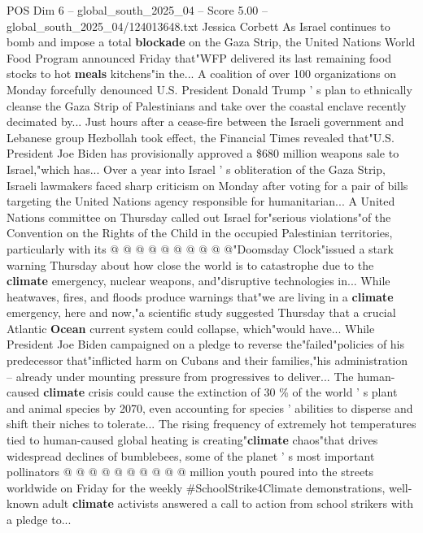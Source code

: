 \begin{textsample}{POS Dim 6 – global\_south\_2025\_04 – Score 5.00 – global\_south\_2025\_04/124013648.txt}  \label{ex:f6_pos_234}
Jessica Corbett As Israel continues to bomb and impose a total \textbf{blockade} on the Gaza Strip, the United Nations World Food Program announced Friday that"WFP delivered its last remaining food stocks to hot \textbf{meals} kitchens"in the...
A coalition of over 100 organizations on Monday forcefully denounced U.S.
President Donald Trump ' s plan to ethnically cleanse the Gaza Strip of Palestinians and take over the coastal enclave recently decimated by...
Just hours after a cease-fire between the Israeli government and Lebanese group Hezbollah took effect, the Financial Times revealed that"U.S.
President Joe Biden has provisionally approved a \$680 million weapons sale to Israel,"which has...
Over a year into Israel ' s obliteration of the Gaza Strip, Israeli lawmakers faced sharp criticism on Monday after voting for a pair of bills targeting the United Nations agency responsible for humanitarian...
A United Nations committee on Thursday called out Israel for"serious violations"of the Convention on the Rights of the Child in the occupied Palestinian territories, particularly with its @ @ @ @ @ @ @ @ @ @"Doomsday Clock"issued a stark warning Thursday about how close the world is to catastrophe due to the \textbf{climate} emergency, nuclear weapons, and"disruptive technologies in...
While heatwaves, fires, and floods produce warnings that"we are living in a \textbf{climate} emergency, here and now,"a scientific study suggested Thursday that a crucial Atlantic \textbf{Ocean} current system could collapse, which"would have...
While President Joe Biden campaigned on a pledge to reverse the"failed"policies of his predecessor that"inflicted harm on Cubans and their families,"his administration -- already under mounting pressure from progressives to deliver...
The human-caused \textbf{climate} crisis could cause the extinction of 30 \% of the world ' s plant and animal species by 2070, even accounting for species ' abilities to disperse and shift their niches to tolerate...
The rising frequency of extremely hot temperatures tied to human-caused global heating is creating"\textbf{climate} chaos"that drives widespread declines of bumblebees, some of the planet ' s most important pollinators @ @ @ @ @ @ @ @ @ @ million youth poured into the streets worldwide on Friday for the weekly \#SchoolStrike4Climate demonstrations, well-known adult \textbf{climate} activists answered a call to action from school strikers with a pledge to...

\end{textsample}

